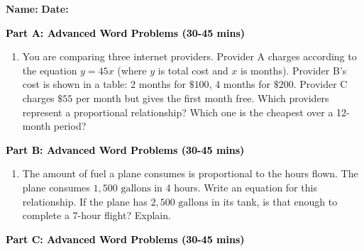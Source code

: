 \documentclass[12pt, letterpaper, fleqn]{article}
\begin{document}
\textbf{Name:} \underline{\hspace{5cm}}
\hfill
\textbf{Date:} \underline{\hspace{3cm}}\\


\begin{tcolorbox}[colback=customteal!20]
\large\textcolor{black}{\textbf{Part A: Advanced Word Problems (30-45 mins)}}
\end{tcolorbox}

\vspace{3mm}

\begin{enumerate}[itemsep=5.5cm, leftmargin=0.6cm]
\item You are comparing three internet providers. Provider A charges according to the equation $y = 45x$ (where $y$ is total cost and $x$ is months). Provider B's cost is shown in a table: 2 months for $\$100$, 4 months for $\$200$. Provider C charges $\$55$ per month but gives the first month free. Which providers represent a proportional relationship? Which one is the cheapest over a 12-month period?
\end{enumerate}

\newpage

\begin{tcolorbox}[colback=customteal!20]
\large\textcolor{black}{\textbf{Part B: Advanced Word Problems (30-45 mins)}}
\end{tcolorbox}

\vspace{3mm}

\begin{enumerate}[itemsep=5.5cm, leftmargin=0.6cm, resume]
\item The amount of fuel a plane consumes is proportional to the hours flown. The plane consumes $1,500\text{ gallons}$ in 4 hours. Write an equation for this relationship. If the plane has $2,500\text{ gallons}$ in its tank, is that enough to complete a 7-hour flight? Explain.
\end{enumerate}

\newpage

\begin{tcolorbox}[colback=customteal!20]
\large\textcolor{black}{\textbf{Part C: Advanced Word Problems (30-45 mins)}}
\end{tcolorbox}

\vspace{3mm}
\end{document}
